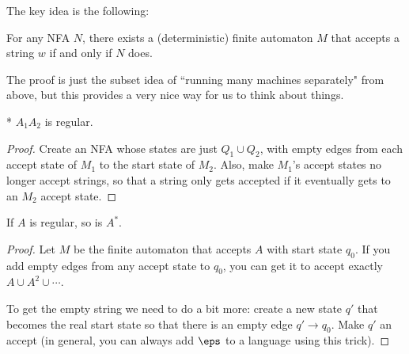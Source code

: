 The key idea is the following:

\begin{thm}
	For any NFA $N$, there exists a (deterministic) finite automaton $M$ that accepts a string $w$ if and only if $N$ does.
\end{thm}

The proof is just the subset idea of ``running many machines separately" from above, but this provides a very nice way for us to think about things.

\begin{cor}*
	$A_1A_2$ is regular.
\end{cor}

\begin{proof}
	Create an NFA whose states are just $Q_1\cup Q_2$, with empty edges from each accept state of $M_1$ to the start state of $M_2$. Also, make $M_1$'s accept states no longer accept strings, so that a string only gets accepted if it eventually gets to an $M_2$ accept state.
\end{proof}

\begin{cor}
	If $A$ is regular, so is $A^*$.
\end{cor}

\begin{proof}
	Let $M$ be the finite automaton that accepts $A$ with start state $q_0$. If you add empty edges from any accept state to $q_0$, you can get it to accept exactly $A\cup A^2 \cup \cdots$. 

	To get the empty string we need to do a bit more: create a new state $q'$ that becomes the real start state so that there is an empty edge $q'\to q_0$. Make $q'$ an accept (in general, you can always add $\eps$ to a language using this trick). 
\end{proof}
